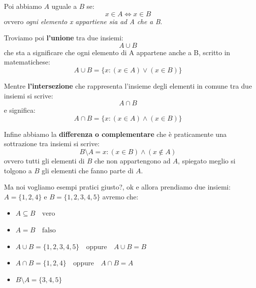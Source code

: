 \documentclass{article}
\begin{document}
Poi abbiamo $A$ uguale a $B$ se:
\begin{equation}
        x \in A \Leftrightarrow x \in B
\end{equation}
ovvero \textit{ogni elemento x appartiene sia ad A che a B}. \newline

Troviamo poi \textbf{l'unione} tra due insiemi: 
\begin{equation}\label{eq:def_unione}
        A \cup B 
\end{equation}
che sta a significare che ogni elemento di A appartene anche a B, scritto in matematichese:
\begin{equation}
        A \cup B = \{x : (x \in A) \vee (x \in B)\}
\end{equation} \newline


Mentre \textbf{l'intersezione} che rappresenta l'insieme degli elementi in comune tra due insiemi si scrive: 
\begin{equation}
        A \cap B
\end{equation}
e significa:
\begin{equation}
        A \cap B = \{x : (x \in A) \wedge (x \in B)\}
\end{equation} \newline

Infine abbiamo la \textbf{differenza o complementare} che è praticamente una sottrazione tra insiemi si scrive:
\begin{equation}
        B \setminus A = {x : (x \in B) \wedge (x \notin A)}
\end{equation}
ovvero tutti gli elementi di $B$ che non appartengono ad $A$, spiegato meglio si tolgono a $B$ gli elementi che fanno parte di $A$. \newline

Ma noi vogliamo esempi pratici giusto?, ok e  allora prendiamo due insiemi: $A = \{1,2,4\}$ e $B = \{1,2,3,4,5\}$ avremo che:
\begin{itemize}
        \item $A \subseteq B \quad \mbox{vero}$ 
        \item $A = B \quad \mbox{falso}$
        \item $A \cup B = \{1, 2, 3, 4, 5\} \quad \mbox{oppure} \quad A \cup B = B$
        \item $A \cap B = \{1, 2, 4\} \quad \mbox{oppure} \quad A \cap B = A$
        \item $B \setminus A = \{3, 4, 5\}$
\end{itemize}
\end{document}
